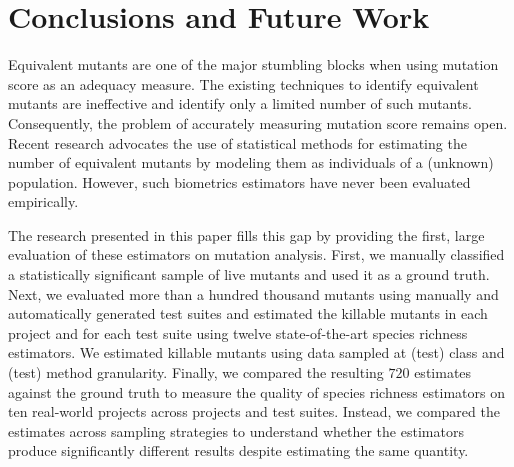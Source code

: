 \documentclass[sigconf,review,anonymous]{acmart}
\newcommand{\estimatorCount}{twelve\xspace}
\begin{document}

\section{Conclusions and Future Work}
Equivalent mutants are one of the major stumbling blocks when using mutation
score as an adequacy measure. The existing techniques to identify equivalent mutants
are ineffective and identify only a limited number of such mutants. 
%
Consequently, the problem of accurately measuring 
mutation score %
remains open.
%
Recent research advocates the use of statistical methods for estimating the number of 
equivalent mutants by modeling them as individuals of a (unknown) population.
%
However, such biometrics estimators have never been evaluated empirically.

The research presented in this paper fills this gap by 
providing the first, large evaluation of these estimators on mutation analysis. 
%
First, we manually classified a statistically significant sample of live mutants
and used it as a ground truth.
%
Next, we evaluated more than a hundred thousand mutants
using manually and automatically generated test suites and
estimated the killable mutants in each project and for each test suite
using \estimatorCount state-of-the-art species richness estimators.
We estimated killable mutants using data sampled at (test) class
and (test) method granularity.
%
Finally, we compared the resulting $720$ estimates against the ground truth
 to measure the quality of species richness estimators on ten real-world projects
 across projects and test suites.
 Instead, we compared the estimates across sampling strategies to understand
 whether the estimators produce %
 significantly different results despite estimating the same quantity. %
\end{document}
